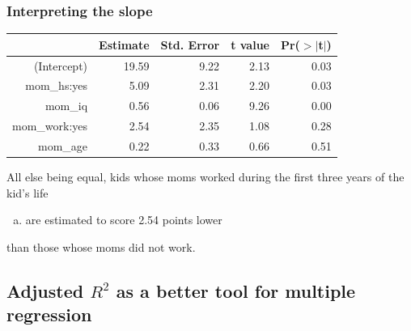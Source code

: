 
\begin{frame}
\frametitle{Interpreting the slope}


{\scriptsize
\begin{center}
\begin{tabular}{rrrrr}
  \hline
 & Estimate & Std. Error & t value & Pr($>$$|$t$|$) \\ 
  \hline
(Intercept) & 19.59 & 9.22 & 2.13 & 0.03 \\ 
  mom\_hs:yes & 5.09 & 2.31 & 2.20 & 0.03 \\ 
  mom\_iq & 0.56 & 0.06 & 9.26 & 0.00 \\ 
  mom\_work:yes & 2.54 & 2.35 & 1.08 & 0.28 \\ 
  mom\_age & 0.22 & 0.33 & 0.66 & 0.51 \\ 
   \hline
\end{tabular}
\end{center}
}

All else being equal, kids whose moms worked during the first three years of the kid's life
\begin{enumerate}[(a)]
\item are estimated to score 2.54 points lower
\end{enumerate}
than those whose moms did not work.
 
\end{frame}


\subsection{Adjusted $R^2$ as a better tool for multiple regression}


